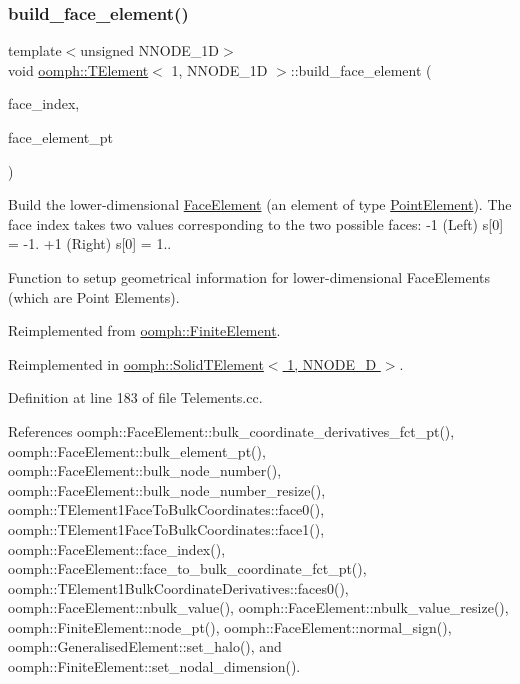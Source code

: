 \subsubsection{\texorpdfstring{build\+\_\+face\+\_\+element()}{build\_face\_element()}}
{\footnotesize\ttfamily template$<$unsigned N\+N\+O\+D\+E\+\_\+1D$>$ \\
void \hyperlink{classoomph_1_1TElement}{oomph\+::\+T\+Element}$<$ 1, N\+N\+O\+D\+E\+\_\+1D $>$\+::build\+\_\+face\+\_\+element (\begin{DoxyParamCaption}\item[{const int \&}]{face\+\_\+index,  }\item[{\hyperlink{classoomph_1_1FaceElement}{Face\+Element} $\ast$}]{face\+\_\+element\+\_\+pt }\end{DoxyParamCaption})\hspace{0.3cm}{\ttfamily [virtual]}}



Build the lower-\/dimensional \hyperlink{classoomph_1_1FaceElement}{Face\+Element} (an element of type \hyperlink{classoomph_1_1PointElement}{Point\+Element}). The face index takes two values corresponding to the two possible faces\+: -\/1 (Left) s\mbox{[}0\mbox{]} = -\/1. +1 (Right) s\mbox{[}0\mbox{]} = 1.. 

Function to setup geometrical information for lower-\/dimensional Face\+Elements (which are Point Elements). 

Reimplemented from \hyperlink{classoomph_1_1FiniteElement_aaf7bead5b462cfd5401d97b3dbdc7af7}{oomph\+::\+Finite\+Element}.



Reimplemented in \hyperlink{classoomph_1_1SolidTElement_3_011_00_01NNODE__1D_01_4_af28faf30149cf74367333bcad014625a}{oomph\+::\+Solid\+T\+Element$<$ 1, N\+N\+O\+D\+E\+\_\+D $>$}.



Definition at line 183 of file Telements.\+cc.



References oomph\+::\+Face\+Element\+::bulk\+\_\+coordinate\+\_\+derivatives\+\_\+fct\+\_\+pt(), oomph\+::\+Face\+Element\+::bulk\+\_\+element\+\_\+pt(), oomph\+::\+Face\+Element\+::bulk\+\_\+node\+\_\+number(), oomph\+::\+Face\+Element\+::bulk\+\_\+node\+\_\+number\+\_\+resize(), oomph\+::\+T\+Element1\+Face\+To\+Bulk\+Coordinates\+::face0(), oomph\+::\+T\+Element1\+Face\+To\+Bulk\+Coordinates\+::face1(), oomph\+::\+Face\+Element\+::face\+\_\+index(), oomph\+::\+Face\+Element\+::face\+\_\+to\+\_\+bulk\+\_\+coordinate\+\_\+fct\+\_\+pt(), oomph\+::\+T\+Element1\+Bulk\+Coordinate\+Derivatives\+::faces0(), oomph\+::\+Face\+Element\+::nbulk\+\_\+value(), oomph\+::\+Face\+Element\+::nbulk\+\_\+value\+\_\+resize(), oomph\+::\+Finite\+Element\+::node\+\_\+pt(), oomph\+::\+Face\+Element\+::normal\+\_\+sign(), oomph\+::\+Generalised\+Element\+::set\+\_\+halo(), and oomph\+::\+Finite\+Element\+::set\+\_\+nodal\+\_\+dimension().

